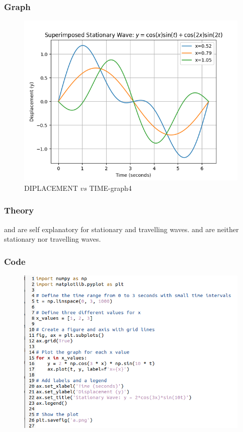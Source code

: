 \documentclass{beamer}
\begin{document}
\begin{frame}
\frametitle{Graph}
\begin{figure}[ht]
                            \centering
                            \includegraphics[width=\columnwidth]{figs/d.png}
                            \caption{DIPLACEMENT $vs$ TIME-graph4}
                            \label{fig:4}
\end{figure}
\end{frame}

\begin{frame}
\frametitle{Theory}
 and  are self explanatory for stationary and travelling waves.
 and  are neither stationary nor travelling waves. 
\end{frame}

\begin{frame}
\frametitle{Code}
\begin{figure}[ht]
                        \centering
                        \includegraphics[width=\columnwidth]{figs/1.png}
                        \label{fig:1.1}
\end{figure}
\end{frame}
\end{document}
